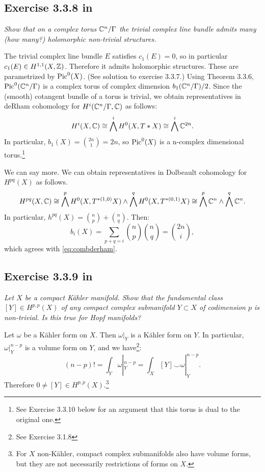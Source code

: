 \documentclass{article}
\begin{document}
\subsection*{Exercise 3.3.8 in \cite{Huy}}
\emph{Show that on a complex torus $\mathbb{C}^n/\Gamma$ the trivial complex line bundle admits
many (how many?) holomorphic non-trivial structures.}
\vspace{3mm}

The trivial complex line bundle $E$ satisfies $c_1(E) = 0$, so in particular $c_1(E) \in H^{1,1}(X,\mathbb{Z})$. Therefore
it admits holomorphic structures. These are parametrized by $\operatorname{Pic}^0(X)$. (See solution to exercise 3.3.7.) Using Theorem
3.3.6, $\operatorname{Pic}^0(\mathbb{C}^n/\Gamma)$ is a complex torus of complex dimension $b_1(\mathbb{C}^n/\Gamma)/2$. Since the (smooth) cotangent bundle of a torus
is trivial, we obtain representatives in deRham cohomology for $H^i(\mathbb{C}^n/\Gamma,\mathbb{C})$ as follows:
\begin{equation}
\label{eq:combderham}
	H^i(X , \mathbb{C}) \cong \bigwedge^i H^0(X, T*X) \cong \bigwedge^i \mathbb{C}^{2n}.
\end{equation}
In particular, $b_1(X) = \binom{2n}{1} = 2n$, so $\operatorname{Pic}^0(X)$ is a n-complex dimensional torus.\footnote{See Exercise
3.3.10 below for an argument that this torus is dual to the original one.}

We can say more. We can obtain representatives in Dolbeault cohomology for $H^{pq}(X)$ as follows.
\[	H^{pq}(X, \mathbb{C}) \cong \bigwedge^p H^0(X, T^{*(1,0)}X) \wedge \bigwedge^q H^0(X, T^{*(0,1)}X) \cong 
\bigwedge^p \mathbb{C}^n \wedge \bigwedge^q \mathbb{C}^{n}. 	\]
In particular, $h^{pq}(X) = \binom{n}{p} + \binom{n}{q}$. Then:
\[	b_{i}(X) = \sum_{p+q=i} \binom{n}{p} \binom{n}{q} = \binom{2n}{i},	\]
which agrees with \ref{eq:combderham}.


\subsection*{Exercise 3.3.9 in \cite{Huy}}
\emph{Let $X$ be a compact K\"{a}hler manifold. Show that the fundamental class
$[Y] \in H^{p,p}(X)$ of any compact complex submanifold $Y \subset X$ of codimension $p$ is
non-trivial. Is this true for Hopf manifolds?}
\vspace{3mm}

Let $\omega$ be a K\"{a}hler form on $X$. Then $\omega|_Y$ is a K\"{a}hler form on $Y$. In particular, 
$\omega|_Y^{n-p}$ is a volume form on $Y$, and we have\footnote{See Exercise 3.1.8}:
\[	(n-p)! =  \int_Y \omega|_Y^{n-p} = \int_X [Y] \smile \omega|_Y^{n-p}.	\]
Therefore $0 \neq [Y] \in H^{p,p}(X)$.\footnote{For $X$ non-K\"{a}hler, compact complex submanifolds also have
volume forms, but they are not necessarily restrictions of forms on $X$.}
\end{document}
